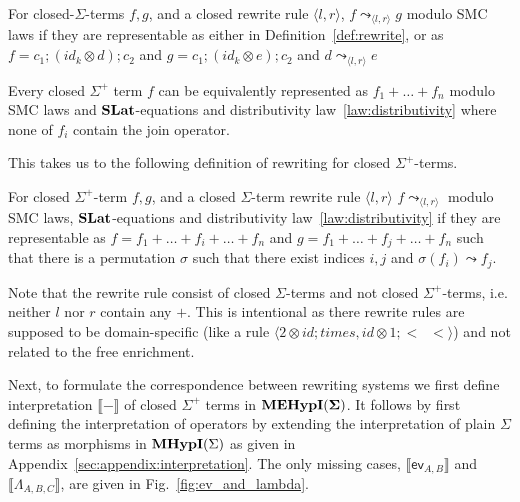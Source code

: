     
\begin{definition}
	For closed-$\Sigma$-terms $f,g$, and a closed rewrite rule $\langle l, r \rangle$, $f \leadsto_{\langle l, r \rangle} g$ modulo SMC laws if they are representable as either in Definition~\ref{def:rewrite}, or as
	$
		f = c_{1};(id_{k} \otimes d);c_{2} $ and $ g = c_{1};(id_{k} \otimes e);c_{2}
	$
	and $d \leadsto_{\langle l, r \rangle} e$
\end{definition}
\begin{lemma}
	\label{lemma:normal_form}
	Every closed $\Sigma^{+}$ term $f$ can be equivalently represented as
	$
		f_{1} + \ldots + f_{n}
	$ modulo SMC laws and $\mathbf{SLat}$-equations and distributivity law~\ref{law:distributivity} where none of $f_{i}$ contain the join operator.
\end{lemma}
This takes us to the following definition of rewriting for closed $\Sigma^{+}$-terms.
\begin{definition}
	For closed $\Sigma^{+}$-term $f,g$, and a closed $\Sigma$-term rewrite rule $\langle l, r \rangle$ $f \leadsto_{\langle l, r \rangle}$ modulo SMC laws, $\mathbf{SLat}$-equations and distributivity law~\ref{law:distributivity} if they are representable as
	$
		f = f_{1} + \ldots + f_{i} + \ldots + f_{n} $ and $ g = f_{1} + \ldots + f_{j} + \ldots + f_{n}
	$
	such that there is a permutation $\sigma$ such that there exist indices $i,j$ and $\sigma(f_{i}) \leadsto f_{j}$.
\end{definition}
Note that the rewrite rule consist of closed $\Sigma$-terms and not closed $\Sigma^{+}$-terms, i.e. neither $l$ nor $r$ contain any $+$.
This is intentional as there rewrite rules are supposed to be domain-specific (like a rule $\langle 2 \otimes id;times, id \otimes 1; <\;\;< \rangle$) and not related to the free enrichment.

Next, to formulate the correspondence between rewriting systems we first define interpretation $\llbracket - \rrbracket$ of closed $\Sigma^{+}$ terms in ${\mathbf{MEHypI(\Sigma)}}$.
It follows by first defining the interpretation of operators by extending the interpretation of plain $\Sigma$ terms as morphisms in $\textbf{MHypI}(\Sigma)$ as given in Appendix~\ref{sec:appendix:interpretation}.
The only missing cases, $\llbracket \textsf{ev}_{A,B} \rrbracket$ and $\llbracket \Lambda_{A,B,C} \rrbracket$, are given in Fig.~\ref{fig:ev_and_lambda}.

